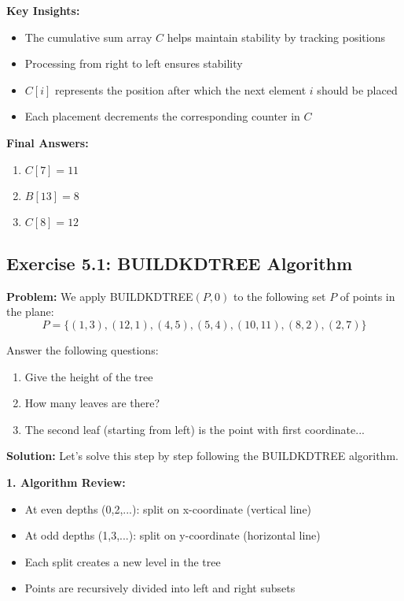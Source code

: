 \textbf{Key Insights:}
\begin{itemize}[noitemsep]
    \item The cumulative sum array $C$ helps maintain stability by tracking positions
    \item Processing from right to left ensures stability
    \item $C[i]$ represents the position after which the next element $i$ should be placed
    \item Each placement decrements the corresponding counter in $C$
\end{itemize}

\textbf{Final Answers:}
\begin{enumerate}[noitemsep]
    \item $C[7] = 11$
    \item $B[13] = 8$
    \item $C[8] = 12$
\end{enumerate}

\subsection{Exercise 5.1: BUILDKDTREE Algorithm}
\textbf{Problem:} We apply BUILDKDTREE$(P,0)$ to the following set $P$ of points in the plane:
\[ P = \{(1,3), (12,1), (4,5), (5,4), (10,11), (8,2), (2,7)\} \]

Answer the following questions:
\begin{enumerate}[leftmargin=*,noitemsep]
    \item Give the height of the tree
    \item How many leaves are there?
    \item The second leaf (starting from left) is the point with first coordinate...
\end{enumerate}

\textbf{Solution:} Let's solve this step by step following the BUILDKDTREE algorithm.

\textbf{1. Algorithm Review:}
\begin{itemize}[noitemsep]
    \item At even depths (0,2,...): split on x-coordinate (vertical line)
    \item At odd depths (1,3,...): split on y-coordinate (horizontal line)
    \item Each split creates a new level in the tree
    \item Points are recursively divided into left and right subsets
\end{itemize}


